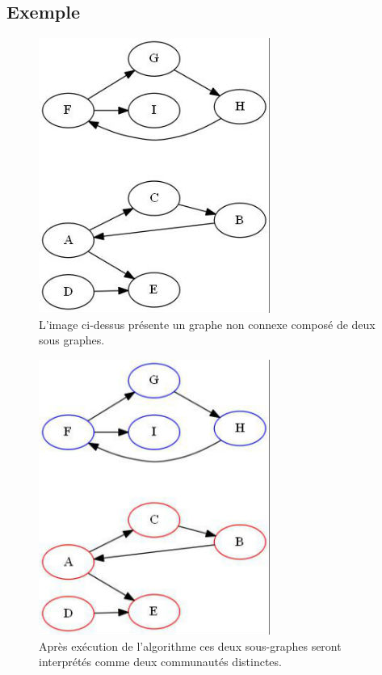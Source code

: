 \documentclass[12pt, oneside]{article}
\begin{document}
\subsection{Exemple}
\begin{figure}[!h]
    \centering
    \includegraphics[scale=0.7,trim=3 3 3 3,clip]{2_2_0}
    \caption{L'image ci-dessus présente un graphe non connexe composé de deux sous graphes.}
\end{figure}

\begin{figure}[!h]
    \centering
    \includegraphics[scale=0.7,trim=3 3 3 3,clip]{2_2_1}
    \caption{Après exécution de l'algorithme ces deux sous-graphes seront interprétés comme deux communautés distinctes.}
\end{figure}
\end{document}
